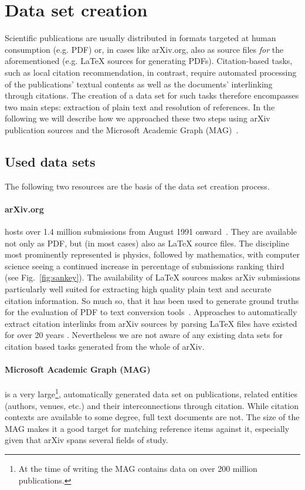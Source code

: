 \section{Data set creation}\label{sec:data-set-creation}
Scientific publications are usually distributed in formats targeted at human consumption (e.g. PDF) or, in cases like arXiv.org, also as source files \emph{for} the aforementioned (e.g. \LaTeX{} sources for generating PDFs). Citation-based tasks, such as local citation recommendation, in contrast, require automated processing of the publications' textual contents as well as the documents' interlinking through citations. The creation of a data set for such tasks therefore encompasses two main steps: extraction of plain text and resolution of references. In the following we will describe how we approached these two steps using arXiv publication sources and the Microsoft Academic Graph (MAG)~\cite{Sinha2015}.

\subsection{Used data sets}

The following two resources are the basis of the data set creation process.

\paragraph{arXiv.org} hosts over 1.4 million submissions from August 1991 onward~\cite{Ginsparg1994}. They are available not only as PDF, but (in most cases) also as \LaTeX{} source files. The discipline most prominently represented is physics, followed by mathematics, with computer science seeing a continued increase in percentage of submissions ranking third (see Fig.~\ref{fig:sankey}). The availability of \LaTeX{} sources makes arXiv submissions particularly well suited for extracting high quality plain text and accurate citation information. So much so, that it has been used to generate ground truths for the evaluation of PDF to text conversion tools~\cite{Bast2017}. Approaches to automatically extract citation interlinks from arXiv sources by parsing \LaTeX{} files have existed for over 20 years \cite{Nanba1998}. Nevertheless we are not aware of any existing data sets for citation based tasks generated from the whole of arXiv.

\paragraph{Microsoft Academic Graph (MAG)} is a very large\footnote{At the time of writing the MAG contains data on over 200 million publications.}, automatically generated data set on publications, related entities (authors, venues, etc.) and their interconnections through citation. While citation contexts are available to some degree, full text documents are not. The size of the MAG makes it a good target for matching reference items against it, especially given that arXiv spans several fields of study.


